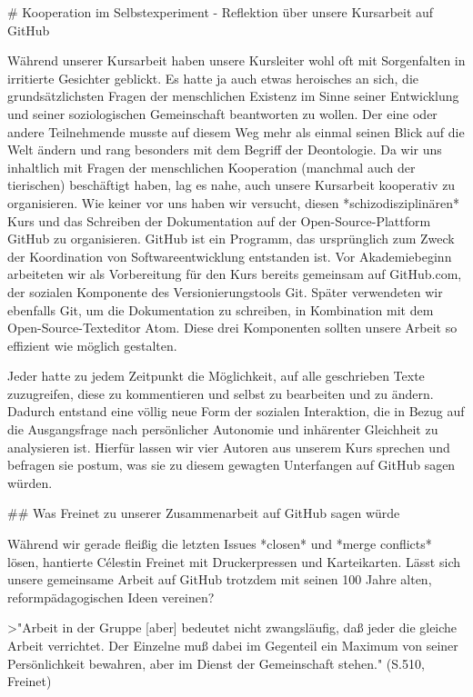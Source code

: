 # Kooperation im Selbstexperiment - Reflektion über unsere Kursarbeit auf GitHub

Während unserer Kursarbeit haben unsere Kursleiter wohl oft mit Sorgenfalten in irritierte Gesichter geblickt.
Es hatte ja auch etwas heroisches an sich, die grundsätzlichsten Fragen der menschlichen Existenz im Sinne seiner Entwicklung und seiner soziologischen Gemeinschaft beantworten zu wollen.
Der eine oder andere Teilnehmende musste auf diesem Weg mehr als einmal seinen Blick auf die Welt ändern und rang besonders mit dem Begriff der Deontologie.
Da wir uns inhaltlich mit Fragen der menschlichen Kooperation (manchmal auch der tierischen) beschäftigt haben, lag es nahe, auch unsere Kursarbeit kooperativ zu organisieren.
Wie keiner vor uns haben wir versucht, diesen *schizodisziplinären* Kurs und das Schreiben der Dokumentation auf der Open-Source-Plattform GitHub zu organisieren.
GitHub ist ein Programm, das ursprünglich zum Zweck der Koordination von Softwareentwicklung entstanden ist.
Vor Akademiebeginn arbeiteten wir als Vorbereitung für den Kurs bereits gemeinsam auf GitHub.com, der sozialen Komponente des Versionierungstools Git.
Später verwendeten wir ebenfalls Git, um die Dokumentation zu schreiben, in Kombination mit dem Open-Source-Texteditor Atom.
Diese drei Komponenten sollten unsere Arbeit so effizient wie möglich gestalten.

Jeder hatte zu jedem Zeitpunkt die Möglichkeit, auf alle geschrieben Texte zuzugreifen, diese zu kommentieren und selbst zu bearbeiten und zu ändern.
Dadurch entstand eine völlig neue Form der sozialen Interaktion, die in Bezug auf die Ausgangsfrage nach persönlicher Autonomie und inhärenter Gleichheit zu analysieren ist.
Hierfür lassen wir vier Autoren aus unserem Kurs sprechen und befragen sie postum, was sie zu diesem gewagten Unterfangen auf GitHub sagen würden.


## Was Freinet zu unserer Zusammenarbeit auf GitHub sagen würde

Während wir gerade fleißig die letzten Issues *closen* und *merge conflicts* lösen, hantierte Célestin Freinet mit Druckerpressen und Karteikarten.
Lässt sich unsere gemeinsame Arbeit auf GitHub trotzdem mit seinen 100 Jahre alten, reformpädagogischen Ideen vereinen?

>"Arbeit in der Gruppe [aber] bedeutet nicht zwangsläufig, daß jeder die gleiche Arbeit verrichtet. Der Einzelne muß dabei im Gegenteil ein Maximum von seiner Persönlichkeit bewahren, aber im Dienst der Gemeinschaft stehen." (S.510, Freinet)


